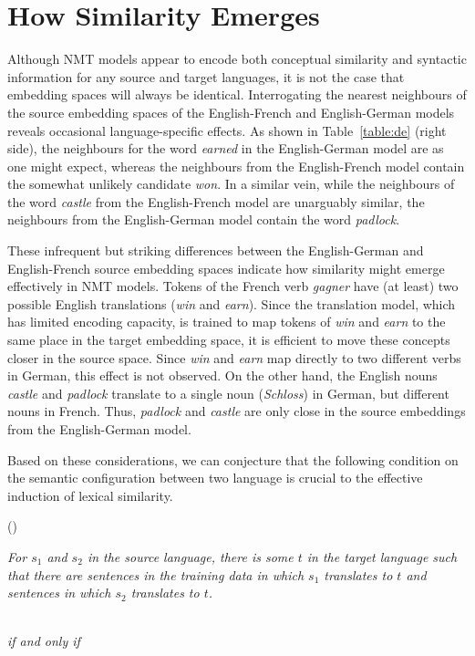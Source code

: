 \documentclass{article} %
\newcounter{quotecount}
\newcommand{\MyQuote}[1]{\vspace{0.4cm}\addtocounter{quotecount}{1}%
     (\arabic{quotecount})\hspace*{1cm}\parbox{12cm}{\em #1}\\[0.4cm]}
\begin{document}
\section{How Similarity Emerges}
\label{section:exp}

Although NMT models appear to encode both conceptual similarity and syntactic information for any source and target languages, it is not the case that embedding spaces will always be identical. Interrogating the nearest neighbours of the source embedding spaces of the English-French and English-German models reveals occasional language-specific effects. As shown in Table~\ref{table:de} (right side), the neighbours for the word \emph{earned} in the English-German model are as one might expect, whereas the neighbours from the English-French model contain the somewhat unlikely candidate \emph{won}. In a similar vein, while the neighbours of the word \emph{castle} from the English-French model are unarguably similar, the neighbours from the English-German model contain the word \emph{padlock}.
 
These infrequent but striking differences between the English-German and English-French source embedding spaces indicate how similarity might emerge effectively in NMT models. Tokens of the French verb \emph{gagner} have (at least) two possible English translations (\emph{win} and \emph{earn}). Since the translation model, which has limited encoding capacity, is trained to map tokens of \emph{win} and \emph{earn} to the same place in the target embedding space, it is efficient to move these concepts closer in the source space. Since \emph{win} and \emph{earn} map directly to two different verbs in German, this effect is not observed. On the other hand, the English nouns \emph{castle} and \emph{padlock} translate to a single noun (\emph{Schloss}) in German, but different nouns in French. Thus, \emph{padlock} and \emph{castle} are only close in the source embeddings from the English-German model. 

Based on these considerations, we can conjecture that the following condition on the semantic configuration between two language is crucial to the effective induction of lexical similarity. 

\MyQuote{\emph{For \(s_1\) and \(s_2\) in the source language, there is some \(t\) in the target language such that there are sentences in the training data in which \(s_1\) translates to \(t\) and sentences in which \(s_2\) translates to \(t\).}}

{\centering \emph{if and only if} \\}
\end{document}
